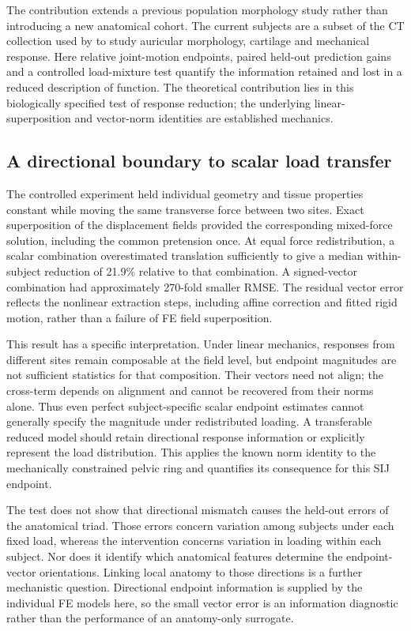 The contribution extends a previous population morphology study rather than introducing a new anatomical cohort. The current subjects are a subset of the CT collection used by \citet{HenysHammer2025} to study auricular morphology, cartilage and mechanical response. Here relative joint-motion endpoints, paired held-out prediction gains and a controlled load-mixture test quantify the information retained and lost in a reduced description of function. The theoretical contribution lies in this biologically specified test of response reduction; the underlying linear-superposition and vector-norm identities are established mechanics.

\subsection*{A directional boundary to scalar load transfer}
The controlled experiment held individual geometry and tissue properties constant while moving the same transverse force between two sites. Exact superposition of the displacement fields provided the corresponding mixed-force solution, including the common pretension once. At equal force redistribution, a scalar combination overestimated translation sufficiently to give a median within-subject reduction of 21.9\% relative to that combination. A signed-vector combination had approximately 270-fold smaller RMSE. The residual vector error reflects the nonlinear extraction steps, including affine correction and fitted rigid motion, rather than a failure of FE field superposition.

This result has a specific interpretation. Under linear mechanics, responses from different sites remain composable at the field level, but endpoint magnitudes are not sufficient statistics for that composition. Their vectors need not align; the cross-term depends on alignment and cannot be recovered from their norms alone. Thus even perfect subject-specific scalar endpoint estimates cannot generally specify the magnitude under redistributed loading. A transferable reduced model should retain directional response information or explicitly represent the load distribution. This applies the known norm identity to the mechanically constrained pelvic ring and quantifies its consequence for this SIJ endpoint.

The test does not show that directional mismatch causes the held-out errors of the anatomical triad. Those errors concern variation among subjects under each fixed load, whereas the intervention concerns variation in loading within each subject. Nor does it identify which anatomical features determine the endpoint-vector orientations. Linking local anatomy to those directions is a further mechanistic question. Directional endpoint information is supplied by the individual FE models here, so the small vector error is an information diagnostic rather than the performance of an anatomy-only surrogate.

